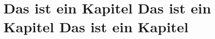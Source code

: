 \documentclass[oneside,11pt,DIV=8,headings=openright]{scrreprt}
\begin{document}
\chapter{Das ist ein Kapitel Das ist ein Kapitel Das ist ein Kapitel
}
\blindtext
\end{document}
